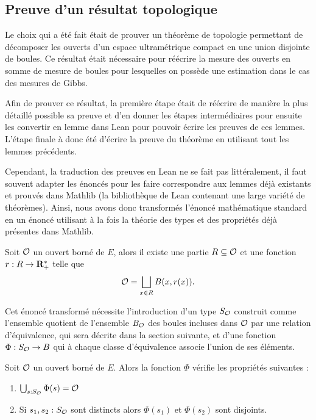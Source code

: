 \documentclass[../../rapport.tex]{subfiles}
\begin{document}
  \subsection{Preuve d'un résultat topologique}

  Le choix qui a été fait était de prouver un théorème de topologie permettant de décomposer les ouverts d'un espace ultramétrique compact
  en une union disjointe de boules.
  Ce résultat était nécessaire pour réécrire la mesure des ouverts en somme de mesure de boules pour lesquelles on possède une estimation
  dans le cas des mesures de Gibbs.

  Afin de prouver ce résultat, la première étape était de réécrire de manière la plus détaillé possible sa preuve et d'en donner
  les étapes intermédiaires pour ensuite les convertir en lemme dans Lean pour pouvoir écrire les preuves de ces lemmes.
  L'étape finale à donc été d'écrire la preuve du théorème en utilisant tout les lemmes précédents.

  Cependant, la traduction des preuves en Lean ne se fait pas littéralement, il faut souvent adapter les énoncés pour
  les faire correspondre aux lemmes déjà existants et prouvés dans Mathlib (la bibliothèque de Lean contenant une large variété de théorèmes).
  Ainsi, nous avons donc transformés l'énoncé mathématique standard %
  en un énoncé utilisant à la fois la théorie des types et des propriétés déjà présentes dans Mathlib.
  \begin{theorem*}
    Soit $\mathcal{O}$ un ouvert borné de $E$, alors il existe une partie $R \subseteq \mathcal{O}$ et une fonction $r : R \rightarrow \mathbf R^*_+$ telle que
    $$\mathcal{O} = \bigsqcup_{x \in R}{B(x, r(x))}.$$
  \end{theorem*}
  Cet énoncé transformé nécessite l'introduction d'un type $S_{\mathcal{O}}$
  construit comme l'ensemble quotient de l'ensemble $B_{\mathcal{O}}$ des boules incluses dans $\mathcal{O}$
  par une relation d'équivalence, qui sera décrite dans la section suivante,
  et d'une fonction $\Phi : S_{\mathcal{O}} \rightarrow B$ qui à chaque classe d'équivalence associe l'union de ses éléments.

  \begin{theorem*}
    Soit $\mathcal{O}$ un ouvert borné de $E$. Alors la fonction $\Phi$ vérifie les propriétés suivantes :
    \begin{enumerate}
      \item $\bigcup_{s : S_{\mathcal{O}}}{\Phi(s)} = \mathcal{O}$
      \item Si $s_1, s_2 : S_{\mathcal{O}}$ sont distincts alors $\Phi(s_1)$ et $\Phi(s_2)$ sont disjoints.
    \end{enumerate}
  \end{theorem*}
\end{document}
